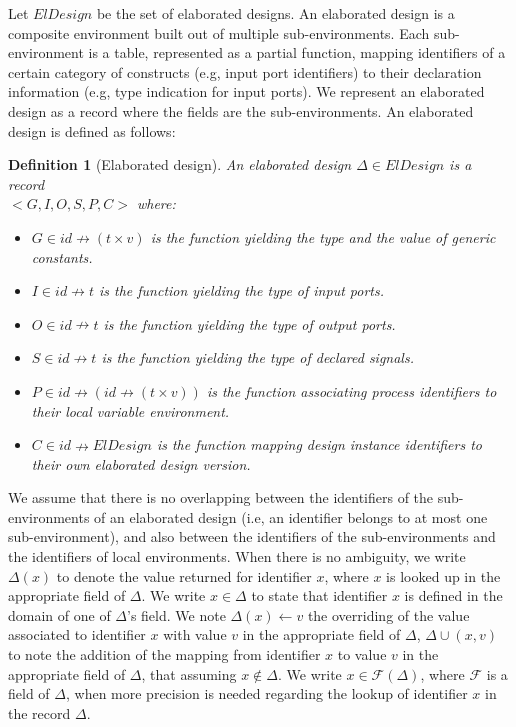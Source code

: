 \documentclass[pdflatex,sn-mathphys]{sn-jnl}%
\theoremstyle{thmstyleone}%
\theoremstyle{thmstyletwo}%
\theoremstyle{thmstylethree}%
\newtheorem{definition}{Definition}%
\begin{document}
Let $ElDesign$ be the set of elaborated designs. An elaborated design
is a composite environment built out of multiple sub-environments.
Each sub-environment is a table, represented as a partial function,
mapping identifiers of a certain category of constructs (e.g, input
port identifiers) to their declaration information (e.g, type
indication for input ports). We represent an elaborated design as a
record where the fields are the sub-environments. An elaborated design
is defined as follows:

\begin{definition}[Elaborated design]
  \label{def:elab-design}
  An elaborated design $\Delta\in{}ElDesign$ is a record\\
  ${<}G, I, O, S, P, C{>}$ where:
  \begin{itemize}[label=$-$]
  \item $G\in{}id\nrightarrow{}(t\times{}v)$
    is the function yielding the type and the value of generic
    constants.
  \item $I\in{}id\nrightarrow{}t$ is the function
    yielding the type of input ports.
  \item $O\in{}id\nrightarrow{}t$ is the function
    yielding the type of output ports.
  \item
    $S\in{}id\nrightarrow{}t$
    is the function yielding the type of declared signals.
  \item $P\in{}id\nrightarrow(id\nrightarrow{}(t\times{}v))$ is the
    function associating process identifiers to their local variable
    environment.
  \item $C\in{}id{}\nrightarrow{}ElDesign$ is the function mapping
    design instance identifiers to their own elaborated design
    version.
  \end{itemize}
\end{definition}

We assume that there is no overlapping between the identifiers of the
sub-environments of an elaborated design (i.e, an identifier belongs
to at most one sub-environment), and also between the identifiers of
the sub-environments and the identifiers of local environments. When
there is no ambiguity, we write $\Delta(x)$ to denote the value
returned for identifier $x$, where $x$ is looked up in the appropriate
field of $\Delta$. We write $x\in\Delta$ to state that identifier $x$
is defined in the domain of one of $\Delta$'s field. We note
$\Delta(x)\leftarrow{}v$ the overriding of the value associated to
identifier $x$ with value $v$ in the appropriate field of $\Delta$,
$\Delta\cup{}(x,v)$ to note the addition of the mapping from
identifier $x$ to value $v$ in the appropriate field of $\Delta$, that
assuming $x\notin\Delta$. We write $x\in\mathcal{F}(\Delta)$, where
$\mathcal{F}$ is a field of $\Delta$, when more precision is needed
regarding the lookup of identifier $x$ in the record $\Delta$.\\
\end{document}
